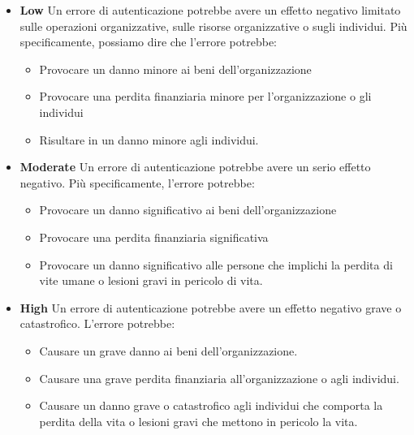 \begin{itemize}

    \item \textbf{Low} Un errore di autenticazione potrebbe avere un effetto negativo limitato sulle operazioni organizzative, sulle risorse organizzative o sugli individui. Più specificamente, possiamo dire che l'errore potrebbe:
    
    \begin{itemize}
        
        \item Provocare un danno minore ai beni dell'organizzazione
        
        \item Provocare una perdita finanziaria minore per l'organizzazione o gli individui
        
        \item Risultare in un danno minore agli individui.
    \end{itemize}
    
    \item \textbf{Moderate} Un errore di autenticazione potrebbe avere un serio effetto negativo. Più specificamente, l'errore potrebbe:
    
    \begin{itemize}
        \item Provocare un danno significativo ai beni dell'organizzazione
        
        \item Provocare una perdita finanziaria significativa
        
        \item Provocare un danno significativo alle persone che implichi la perdita di vite umane o lesioni gravi in pericolo di vita.
    \end{itemize}
    
    \item \textbf{High}
    Un errore di autenticazione potrebbe avere un effetto negativo grave o catastrofico. L'errore potrebbe:
    
    \begin{itemize}
        
        \item Causare un grave danno ai beni dell'organizzazione.
        
        \item Causare una grave perdita finanziaria all'organizzazione o agli individui.
        
        \item Causare un danno grave o catastrofico agli individui che comporta la perdita della vita o lesioni gravi che mettono in pericolo la vita.
    \end{itemize}

\end{itemize}
